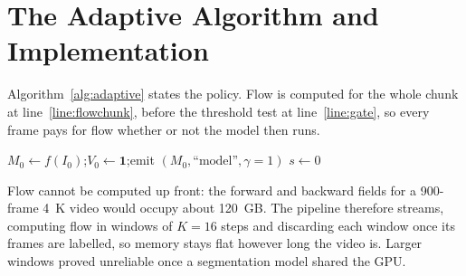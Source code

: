 \documentclass[report.tex]{subfiles}
\begin{document}
\section{The Adaptive Algorithm and Implementation}
\label{sec:algorithm}

Algorithm~\ref{alg:adaptive} states the policy. Flow is computed for the whole
chunk at line~\ref{line:flowchunk}, before the threshold test at
line~\ref{line:gate}, so every frame pays for flow whether or not the model
then runs.

\begin{algorithm}[t]
    \caption{Adaptive hybrid inference}
    \label{alg:adaptive}
    $M_0 \leftarrow f(I_0)$;\quad $V_0 \leftarrow \mathbf{1}$;\quad emit $(M_0, \text{``model''}, \gamma{=}1)$\;
    $s \leftarrow 0$\;
\end{algorithm}

Flow cannot be computed up front: the forward and backward fields for a
900-frame \SI{4}{K} video would occupy about \SI{120}{GB}. The pipeline
therefore streams, computing flow in windows of $K = 16$ steps and discarding
each window once its frames are labelled, so memory stays flat however long
the video is. Larger windows proved unreliable once a segmentation model
shared the GPU.
\end{document}

